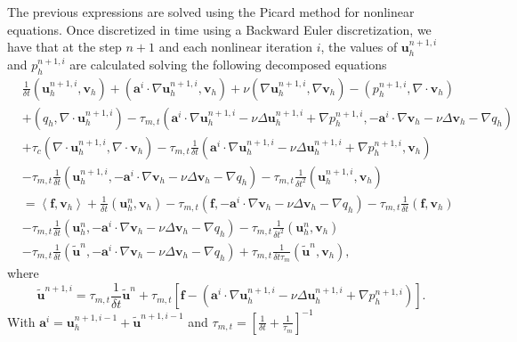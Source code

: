 The previous expressions are solved using the Picard method for nonlinear equations. Once discretized in time using a Backward Euler discretization, we have that at the step $ n+1 $ and each nonlinear iteration $ i $, the values of $ \mathbf{u}_h^{n+1,i} $ and $ p_h^{n+1,i} $ are calculated solving the following decomposed equations
\begin{align}
\label{7}
&\frac{1}{\delta t}(\mathbf{u}_h^{n+1,i},\mathbf{v}_h)+(\mathbf{a}^i\cdot\nabla\mathbf{u}_h^{n+1,i},\mathbf{v}_h)+\nu(\nabla\mathbf{u}_h^{n+1,i},\nabla\mathbf{v}_h)-(p_h^{n+1,i},\nabla\cdot\mathbf{v}_h)\\\nonumber
&+(q_h,\nabla\cdot\mathbf{u}_h^{n+1,i})-\tau_{m,t}(\mathbf{a}^i\cdot\nabla\mathbf{u}_h^{n+1,i}-\nu\Delta\mathbf{u}_h^{n+1,i}+\nabla p_h^{n+1,i},-\mathbf{a}^i\cdot\nabla\mathbf{v}_h-\nu\Delta\mathbf{v}_h-\nabla q_h)\\\nonumber
&+\tau_c(\nabla\cdot\mathbf{u}_h^{n+1,i},\nabla\cdot\mathbf{v}_h)-\tau_{m,t}\frac{1}{\delta t}(\mathbf{a}^i\cdot\nabla\mathbf{u}_h^{n+1,i}-\nu\Delta\mathbf{u}_h^{n+1,i}+\nabla p_h^{n+1,i},\mathbf{v}_h)\\\nonumber
&-\tau_{m,t}\frac{1}{\delta t}(\mathbf{u}_h^{n+1,i},-\mathbf{a}^i\cdot\nabla\mathbf{v}_h-\nu\Delta\mathbf{v}_h-\nabla q_h)-\tau_{m,t}\frac{1}{\delta t^2}(\mathbf{u}_h^{n+1,i},\mathbf{v}_h)\\\nonumber
&=\left<\mathbf{f},\mathbf{v}_h\right>+\frac{1}{\delta t}(\mathbf{u}_h^n,\mathbf{v}_h)-\tau_{m,t}(\mathbf{f},-\mathbf{a}^i\cdot\nabla\mathbf{v}_h-\nu\Delta\mathbf{v}_h-\nabla q_h)-\tau_{m,t}\frac{1}{\delta t}(\mathbf{f},\mathbf{v}_h)\\\nonumber
&-\tau_{m,t}\frac{1}{\delta t}(\mathbf{u}_h^n,-\mathbf{a}^i\cdot\nabla\mathbf{v}_h-\nu\Delta\mathbf{v}_h-\nabla q_h)-\tau_{m,t}\frac{1}{\delta t^2}(\mathbf{u}_h^n,\mathbf{v}_h)\\\nonumber
&-\tau_{m,t}\frac{1}{\delta t}(\tilde{\mathbf{u}}^n,-\mathbf{a}^i\cdot\nabla\mathbf{v}_h-\nu\Delta\mathbf{v}_h-\nabla q_h)+\tau_{m,t}\frac{1}{\delta t\tau_m}(\tilde{\mathbf{u}}^n,\mathbf{v}_h),
\end{align}
where
\begin{equation}
\label{8}
\tilde{\mathbf{u}}^{n+1,i}=\tau_{m,t}\frac{1}{\delta t}\tilde{\mathbf{u}}^n+\tau_{m,t}\left[\mathbf{f}-(\mathbf{a}^i\cdot\nabla\mathbf{u}_h^{n+1,i}-\nu\Delta\mathbf{u}_h^{n+1,i}+\nabla p_h^{n+1,i})\right].
\end{equation}
With $ \mathbf{a}^i=\mathbf{u}_h^{n+1,i-1}+\tilde{\mathbf{u}}^{n+1,i-1} $ and $ \tau_{m,t}=\left[\frac{1}{\delta t}+\frac{1}{\tau_m}\right]^{-1} $

